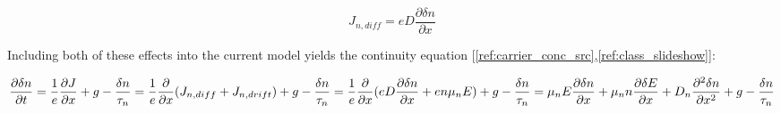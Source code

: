 \begin{equation}
	\label{eq:diffusion}
	J_{n,diff} = eD\frac{\partial \delta n}{\partial x}
\end{equation}

Including both of these effects into the current model yields the continuity equation [\ref{ref:carrier_conc_src},\ref{ref:class_slideshow}]:

\begin{equation}
	\label{eq:cont_eqn}
	\frac{\partial \delta n}{\partial t} = \frac{1}{e} \frac{\partial J}{\partial x} + g - \frac{\delta n}{\tau _n} \\
					     = \frac{1}{e} \frac{\partial}{\partial x} ( J_{n,diff} + J_{n,drift}) + g - \frac{\delta n}{\tau _n} \\
					     = \frac{1}{e} \frac{\partial}{\partial x} ( eD\frac{\partial \delta n}{\partial x} + en\mu _nE ) + g - \frac{\delta n}{\tau _n} \\
					     = \mu _n E \frac{\partial \delta n}{\partial x} + \mu _n n \frac{\partial \delta E}{\partial x} + D_n \frac{\partial^2 \delta n}{\partial x^2} + g - \frac{\delta n}{\tau _n}
\end{equation}



